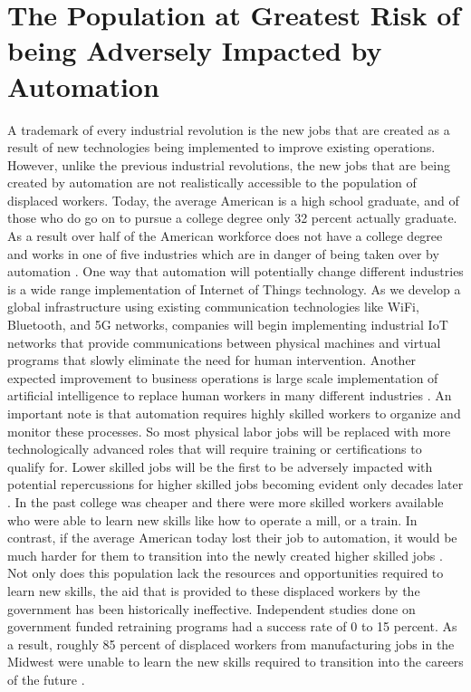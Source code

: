 \documentclass{article}
\begin{document}
\section{The Population at Greatest Risk of being Adversely Impacted by Automation}
A trademark of every industrial revolution is the new jobs that are created as a result of new technologies being implemented to improve existing operations. However, unlike the previous industrial revolutions, the new jobs that are being created by automation are not realistically accessible to the population of displaced workers. Today, the average American is a high school graduate, and of those who do go on to pursue a college degree only 32 percent actually graduate. As a result over half of the American workforce does not have a college degree and works in one of five industries which are in danger of being taken over by automation \cite{rogan_2019}. One way that automation will potentially change different industries is a wide range implementation of Internet of Things technology. As we develop a global infrastructure using existing communication technologies like WiFi, Bluetooth, and 5G networks, companies will begin implementing industrial IoT networks that provide communications between physical machines and virtual programs that slowly eliminate the need for human intervention. Another expected improvement to business operations is large scale implementation of artificial intelligence to replace human workers in many different industries \cite{edseee.911179220200401}. An important note is that automation requires highly skilled workers to organize and monitor these processes. So most physical labor jobs will be replaced with more technologically advanced roles that will require training or certifications to qualify for. Lower skilled jobs will be the first to be adversely impacted with potential repercussions for higher skilled jobs becoming evident only decades later \cite{freeman2001time}. In the past college was cheaper and there were more skilled workers available who were able to learn new skills like how to operate a mill, or a train. In contrast, if the average American today lost their job to automation, it would be much harder for them to transition into the newly created higher skilled jobs \cite{rider_2021}. Not only does this population lack the resources and opportunities required to learn new skills, the aid that is provided to these displaced workers by the government has been historically ineffective. Independent studies done on government funded retraining programs had a success rate of 0 to 15 percent. As a result, roughly 85 percent of displaced workers from manufacturing jobs in the Midwest were unable to learn the new skills required to transition into the careers of the future \cite{rogan_2019}. 
\end{document}
